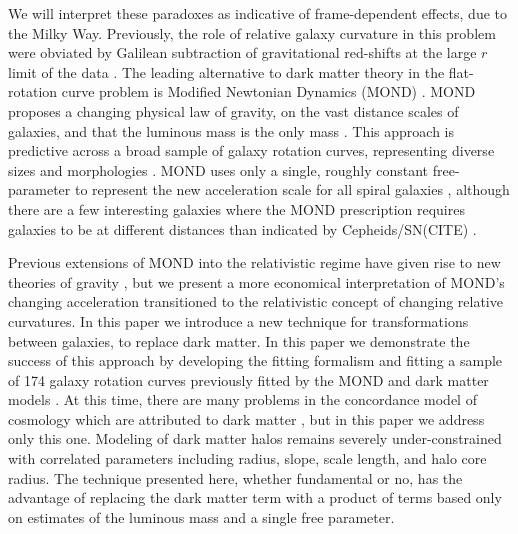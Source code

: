 \documentclass[reprint,%
 amsmath,amssymb,
 aps,
]{revtex4-1}
\begin{document}
  
  We will   interpret these paradoxes   as  indicative of  frame-dependent effects,   due to the Milky Way. 
   Previously, the role of relative
     galaxy curvature  in this problem  were    obviated 
       by  Galilean subtraction of   gravitational red-shifts at the  large $r$  limit of the data \citep{MTW}. 
     The leading   alternative    to dark matter theory  in the flat-rotation curve problem is   Modified Newtonian Dynamics (MOND) \cite{Milgrom}.  MOND    proposes    
     a changing  physical law of gravity,    on the vast distance scales of galaxies, and  that the   luminous mass is the only mass   \cite{McGaugh_2014}. 
  This approach  is   predictive across a  broad  sample of galaxy rotation curves,  representing diverse    sizes and morphologies \cite{2016Lelli}.  MOND uses only   a single, roughly constant free-parameter to represent the new acceleration scale for all spiral   galaxies  \cite{McGaugh2016RAR,2022A&A...664A..40M}, although there are a few interesting galaxies where the MOND prescription requires galaxies to be at different distances than indicated by Cepheids/SN(CITE) . 
  
  
  Previous extensions of MOND into the relativistic regime have given rise to  new theories of gravity  \cite{PhysRevD.70.083509,doi:10.1142/S0217751X0703666X,Famaey2012}, but we present   a more economical interpretation of   MOND's changing acceleration   transitioned to  the relativistic concept  of  changing   relative curvatures.   
  In this paper we   introduce a new  technique for  transformations     between galaxies,  to replace dark matter.   
      In this paper we demonstrate the success of this approach by developing the fitting formalism and fitting   a sample of 174 galaxy rotation curves previously fitted by the MOND and dark matter models  \cite{McGaugh2016RAR,2016Lelli,McGaugh_2014,Li_2018}.  
       At this time, there are many problems in   the concordance model of   cosmology which are attributed to dark matter \cite{2010dmp..book.....S,Tully:2014gfa,Naidu_2022}, but in
 this paper we address only this  one. 
    Modeling of 
dark matter halos remains severely   under-constrained with correlated parameters including radius, slope, scale length, and halo core radius.     
The technique presented here, whether fundamental or no,  has the advantage of replacing the dark matter term  with a product of terms based only on estimates of the luminous mass and   a single free parameter.
   
      
  
 
 
\end{document}
